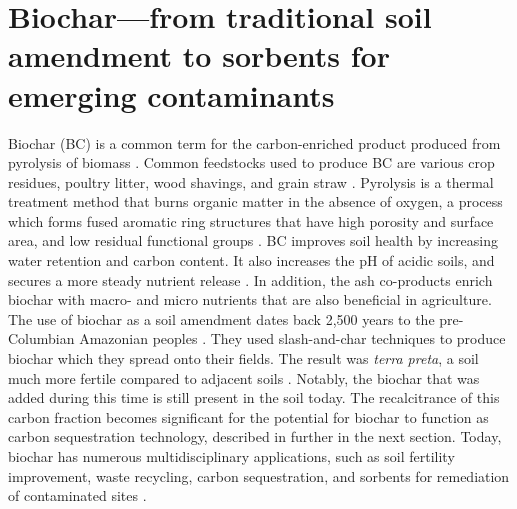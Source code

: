 \section{Biochar---from traditional soil amendment to sorbents for emerging contaminants}
Biochar (BC) is a common term for the carbon-enriched product produced from pyrolysis of biomass \citep{LehmannAndJoseph2015}. Common feedstocks used to produce BC are various crop residues, poultry litter, wood shavings, and grain straw \citep{Ahmad2014}. Pyrolysis is a thermal treatment method that burns organic matter in the absence of oxygen, a process which forms fused aromatic ring structures that have high porosity and surface area, and low residual functional groups \citep{LehmannAndJoseph2015}. BC improves soil health by increasing water retention and carbon content. It also increases the pH of acidic soils, and secures a more steady nutrient release \citep{das2020application}. In addition, the ash co-products enrich biochar with macro- and micro nutrients that are also beneficial in agriculture. The use of biochar as a soil amendment dates back 2,500 years to the pre-Columbian Amazonian peoples \citep{Tindall2017}. They used slash-and-char techniques to produce biochar which they spread onto their fields. The result was \textit{terra preta}, a soil much more fertile compared to adjacent soils \citep{Ahmad2014}. Notably, the biochar that was added during this time is still present in the soil today. The recalcitrance of this carbon fraction becomes significant for the potential for biochar to function as carbon sequestration technology, described in further in the next section. Today, biochar has numerous multidisciplinary applications, such as soil fertility improvement, waste recycling, carbon sequestration, and sorbents for remediation of contaminated sites \citep{beesley2011review}.

